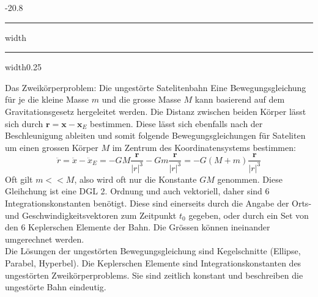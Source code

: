 \documentclass[9pt, landscape, fleqn]{scrartcl}
\makeatletter
\renewcommand{\subsection}{\@startsection{subsection}{1}{0mm}%
{-2\baselineskip}{0.8\baselineskip}%
{\hrule depth 0.2pt width\columnwidth\hrule depth0.75pt
width0.25\columnwidth\vspace*{1.2em}\large\bfseries\rmfamily}}
\makeatother
\begin{document}
\begin{multicols*}{3}
\subsection{Das Zweikörperproblem: Die ungestörte Satelitenbahn}
Eine Bewegungsgleichung für je die kleine Masse $m$ und die grosse Masse $M$ kann basierend auf dem Gravitationsgesetz hergeleitet werden. Die Distanz zwischen beiden Körper lässt sich durch $\mathbf{r} = \mathbf{x}-\mathbf{x}_E$ bestimmen. Diese lässt sich ebenfalls nach der Beschleunigung ableiten und somit folgende Bewegungsgleichungen für Sateliten um einen grossen Körper $M$ im Zentrum des Koordinatensystems bestimmen:
\begin{equation*}
    \ddot{r} = \ddot{x}-\ddot{x}_E = -GM \frac{\mathbf{r}}{|r|^3} -  Gm \frac{\mathbf{r}}{|r|^3} = -G(M+m)\frac{\mathbf{r}}{|r|^3}
\end{equation*}
Oft gilt $m<< M$, also wird oft nur die Konstante $GM$ genommen. Diese Gleihchung ist eine DGL 2. Ordnung und auch vektoriell, daher sind 6 Integrationskonstanten benötigt. Diese sind einerseits durch die Angabe der Orts- und Geschwindigkeitsvektoren zum Zeitpunkt $t_0$ gegeben, oder durch ein Set von den 6 Keplerschen Elemente der Bahn. Die Grössen können ineinander umgerechnet werden. \\

Die Lösungen der ungestörten Bewegungsgleichung sind Kegelschnitte (Ellipse, Parabel, Hyperbel). Die Keplerschen Elemente sind Integrationskonstanten des ungestörten Zweikörperproblems. Sie sind zeitlich konstant und beschreiben die ungestörte Bahn eindeutig.

\end{multicols*}
\end{document}
